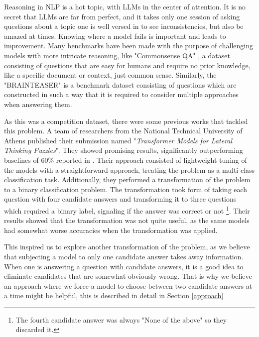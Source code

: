 Reasoning in NLP is a hot topic, with LLMs in the center of attention.  It is no secret that 
LLMs are far from perfect, and it takes only one session of asking questions about a
topic one is well versed in to see inconsistencies, but also be amazed at times.  Knowing where
a model fails is important and leads to improvement.  Many benchmarks have been made with the
purpose of challenging models with more intricate reasoning, like "Commonsense QA"
\citep{commonsenseQA}, a dataset consisting of questions that are easy for humans and require
no prior knowledge, like a specific document or context, just common sense. Similarly, the "BRAINTEASER"
\citep{semeval} is a benchmark dataset consisting of questions which are constructed
in such a way that it is required to consider multiple approaches when answering them.

As this was a competition dataset, there were some previous works that tackled this problem. 
A team of researchers from the National Technical University of Athens published their submission
\citep{ails-lab} named "\textit{Transformer Models for Lateral Thinking Puzzles}".  They showed promising
results, significantly outperforming baselines of 60\% reported in \citep{semeval}. Their approach consisted
of lightweight tuning of the models with a straightforward approach, treating the problem as a
multi-class classification task. Additionally, they performed a
transformation of the problem to a binary classification problem.  The transformation took form of
taking each question with four candidate answers and transforming it to three questions which 
required a binary label, signaling if the answer was correct or not \footnote[2]{The fourth candidate
answer was always "None of the above" so they discarded it.}. Their results showed that the 
transformation was not quite useful, as the same models had somewhat worse accuracies when
the transformation was applied.  

This inspired us to explore another transformation of the problem, as we believe that subjecting
a model to only one candidate answer takes away information.  When one is answering a question
with candidate answers, it is a good idea to eliminate candidates that are somewhat obviously wrong.
That is why we believe an approach where we force a model to choose between two candidate answers
at a time might be helpful, this is described in detail in Section \ref{approach}

